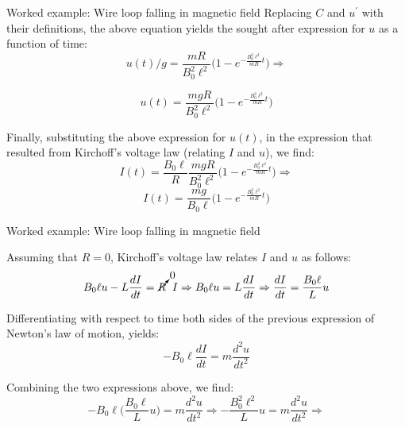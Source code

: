 {\begin{frame}{Worked example: Wire loop falling in magnetic field}
  Replacing $C$ and $u^\prime$ with their definitions, the above equation yields
  the sought after expression for $u$ as a function of time:
  \begin{equation*}
    u(t)/g =
     \frac{mR}{B_0^2 \ell^2} \Big( 1-e^{-\frac{B_0^2 \ell^2}{mR} t} \Big)
     \Rightarrow
  \end{equation*}

  \begin{equation*}
    u(t) =
     \frac{mgR}{B_0^2 \ell^2} \Big( 1-e^{-\frac{B_0^2 \ell^2}{mR} t} \Big)
  \end{equation*}

  Finally, substituting the above expression for $u(t)$, in the expression
  that resulted from Kirchoff's voltage law (relating $I$ and $u$), we find:
  \begin{equation*}
    I(t) = \frac{B_0 \ell}{R}
      \frac{mgR}{B_0^2 \ell^2} \Big( 1-e^{-\frac{B_0^2 \ell^2}{mR} t} \Big)
        \Rightarrow
  \end{equation*}
  \begin{equation*}
    I(t) = \frac{mg}{B_0 \ell} \Big( 1-e^{-\frac{B_0^2 \ell^2}{mR} t} \Big)
  \end{equation*}

\end{frame}

%
%
%

\begin{frame}{Worked example: Wire loop falling in magnetic field}


  Assuming that $R=0$, Kirchoff's voltage law
  relates $I$ and $u$ as follows:
  \begin{equation*}
    B_0 \ell u - L \frac{dI}{dt} = \cancelto{0}{R} \;\; I \Rightarrow
    B_0 \ell u = L \frac{dI}{dt} \Rightarrow
    \frac{dI}{dt} = \frac{B_0 \ell}{L} u
  \end{equation*}

  Differentiating with respect to time
  both sides of the previous expression of Newton's law of motion, yields:
  \begin{equation*}
    -B_0 \ell \frac{dI}{dt} = m \frac{d^2 u}{dt^2}
  \end{equation*}

  Combining the two expressions above, we find:
  \begin{equation*}
    -B_0 \ell \Big( \frac{B_0 \ell}{L} u \Big) = m \frac{d^2 u}{dt^2} \Rightarrow
    -\frac{B_0^2 \ell^2}{L} u = m \frac{d^2 u}{dt^2} \Rightarrow
  \end{equation*}


\end{frame}}
